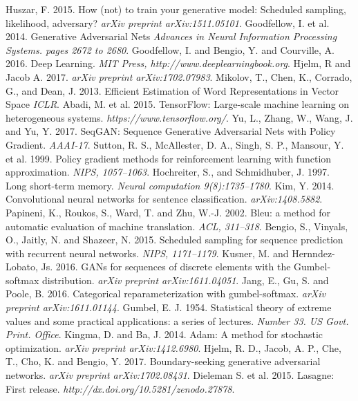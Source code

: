 \documentclass[a4paper,conference]{IEEEtran}
\begin{document}
\begin{thebibliography}{99}
 Huszar, F. 2015. How (not) to train your generative model: Scheduled sampling, likelihood, adversary? \textit{arXiv preprint arXiv:1511.05101}.
 Goodfellow, I. et al. 2014. Generative Adversarial Nets \textit{Advances in Neural Information Processing Systems. pages 2672 to 2680}.
 Goodfellow, I. and Bengio, Y. and Courville, A. 2016. Deep Learning. \textit{MIT Press, http://www.deeplearningbook.org}.
 Hjelm, R and Jacob A. 2017. \textit{arXiv preprint arXiv:1702.07983}.
 Mikolov, T., Chen, K., Corrado, G., and Dean, J. 2013. Efficient Estimation of Word Representations in Vector Space \textit{ICLR}.
 Abadi, M. et al. 2015. TensorFlow: Large-scale machine learning on heterogeneous systems. \textit{https://www.tensorflow.org/}.
 Yu, L., Zhang, W., Wang, J. and Yu, Y. 2017. SeqGAN: Sequence Generative Adversarial Nets with Policy Gradient. \textit{AAAI-17}.
 Sutton, R. S., McAllester, D. A., Singh, S. P.,
Mansour, Y. et al. 1999. Policy gradient methods for reinforcement
learning with function approximation. \textit{NIPS, 1057–1063}.
 Hochreiter, S., and Schmidhuber,
J. 1997. Long short-term memory. \textit{Neural computation
9(8):1735–1780}.
 Kim, Y. 2014. Convolutional neural networks for sentence
classification. \textit{arXiv:1408.5882}.
 Papineni, K., Roukos, S., Ward, T. and Zhu,
W.-J. 2002. Bleu: a method for automatic evaluation of machine
translation. \textit{ACL, 311–318}.
 Bengio, S., Vinyals, O., Jaitly, N. and Shazeer,
N. 2015. Scheduled sampling for sequence prediction with recurrent
neural networks. \textit{NIPS, 1171–1179}.
 Kusner, M. and Hernndez-Lobato, Js. 2016. GANs for sequences of discrete elements with the Gumbel-softmax
distribution. \textit{arXiv preprint arXiv:1611.04051}.
 Jang, E., Gu, S. and Poole, B. 2016. Categorical reparameterization with gumbel-softmax. \textit{arXiv preprint arXiv:1611.01144}.
 Gumbel, E. J. 1954. Statistical theory of extreme values and some practical applications: a series of lectures. \textit{Number 33. US Govt. Print. Office}.
 Kingma, D. and Ba, J. 2014. Adam: A method for stochastic optimization. \textit{arXiv preprint arXiv:1412.6980}.
 Hjelm, R. D., Jacob, A. P., Che, T., Cho, K. and Bengio, Y. 2017. Boundary-seeking generative adversarial networks. \textit{arXiv preprint arXiv:1702.08431}.
 Dieleman S. et al. 2015. Lasagne: First release. \textit{http://dx.doi.org/10.5281/zenodo.27878}.

\end{thebibliography}
\end{document}
